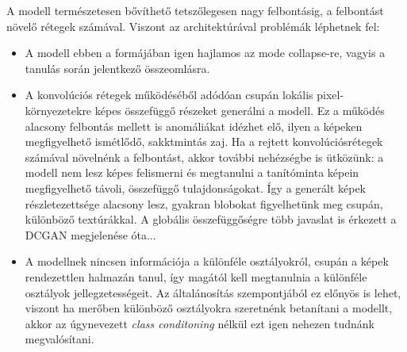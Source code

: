 A modell természetesen bővíthető tetszőlegesen nagy felbontásig, a felbontást növelő rétegek számával. Viszont az architektúrával problémák léphetnek fel:
\begin{itemize}
	\item A modell ebben a formájában igen hajlamos az mode collapse-re, vagyis a tanulás során jelentkező összeomlásra.
	\item A konvolúciós rétegek működéséből adódóan csupán lokális pixel-környezetekre képes összefüggő részeket generálni a modell.
	Ez a működés alacsony felbontás mellett is anomáliákat idézhet elő, ilyen a képeken megfigyelhető ismétlődő, sakktmintás zaj. Ha a rejtett konvolúciósrétegek számával növelnénk a felbontást, akkor további nehézségbe is ütközünk: a modell nem lesz képes felismerni és megtanulni a tanítóminta képein megfigyelhető távoli, összefüggő tulajdonságokat. Így a generált képek részletezettsége alacsony lesz, gyakran blobokat figyelhetünk meg csupán, különböző textúrákkal. A globális összefüggőségre több javaslat is érkezett a DCGAN megjelenése óta...
	\item A modellnek nincsen információja a különféle osztályokról, csupán a képek rendezettlen halmazán tanul, így magától kell megtanulnia a különféle osztályok jellegzetességeit.
	Az általánosítás szempontjából ez előnyös is lehet, viszont ha merőben különböző osztályokra szeretnénk betanítani a modellt, akkor az úgynevezett \textit{class conditoning} nélkül ezt igen nehezen tudnánk megvalósítani.
\end{itemize}
